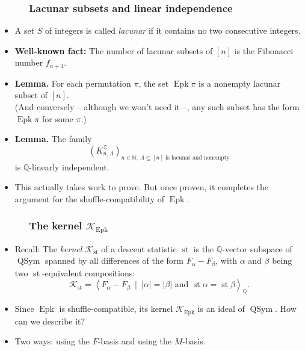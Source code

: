 \documentclass{beamer}
\newcommand{\QQ}{{\mathbb Q}}
\newcommand{\Epk}{\operatorname{Epk}}
\newcommand{\st}{\operatorname{st}}
\newcommand{\QSym}{\operatorname{QSym}}
\newcommand{\calK}{\mathcal{K}}
\newcommand{\fti}[1]{\frametitle{\ \ \ \ \ #1}}
\newcommand{\abs}[1]{\left| #1 \right|}
\newcommand{\ive}[1]{\left[ #1 \right]}
\newcommand{\defn}[1]{{\color{darkred}\emph{#1}}} %
\theoremstyle{plain}
\begin{document}
\begin{frame}
\fti{Lacunar subsets and linear independence}

\begin{itemize}

\item A set $S$ of integers is called \defn{lacunar} if it contains
      no two consecutive integers.

\item \textbf{Well-known fact:} The number of lacunar subsets of
      $\ive{n}$ is the Fibonacci number $f_{n+1}$.

\pause

\item \textbf{Lemma.}
      For each permutation $\pi$, the set $\Epk \pi$ is a nonempty
      lacunar subset of $\ive{n}$. \\
      (And conversely -- although we won't need it --,
      any such subset has the form $\Epk \pi$ for some $\pi$.)

\pause

\item \textbf{Lemma.}
      The family%
\[
\left(  K_{n,\Lambda}^{\mathcal{Z}}\right)  _{n\in\mathbb{N};\ \Lambda
\subseteq\left[  n\right]  \text{ is lacunar and nonempty}}%
\]
is $\mathbb{Q}$-linearly independent.

\item This actually takes work to prove. But once proven, it completes
      the argument for the shuffle-compatibility of $\Epk$.

\end{itemize}

\end{frame}


\begin{frame}
\fti{The kernel $\calK_{\Epk}$}

\begin{itemize}

\item Recall: The \defn{kernel $\calK_{\st}$} of a descent statistic $\st$
      is the $\QQ$-vector subspace of $\QSym$ spanned by all
      differences of the form $F_\alpha - F_\beta$, with $\alpha$
      and $\beta$ being two $\st$-equivalent compositions:
      \[
      \calK_{\st} = \left< F_\alpha - F_\beta \ 
                              \mid \ \abs{\alpha} = \abs{\beta} \text{ and }
                                   \st \alpha = \st \beta \right>_\QQ .
      \]

\pause

\item Since $\Epk$ is shuffle-compatible, its kernel $\calK_{\Epk}$
      is an ideal of $\QSym$.
      How can we describe it?

\item Two ways: using the $F$-basis and using the $M$-basis.

\end{itemize}

\end{frame}
\end{document}
